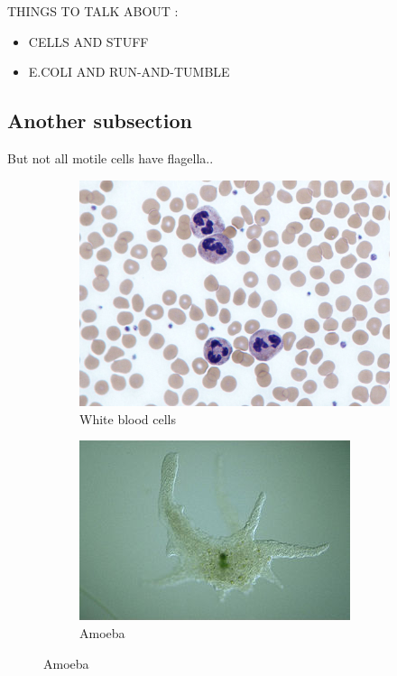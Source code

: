 \begin{outline}

  THINGS TO TALK ABOUT :
  \begin{itemize}
    \item CELLS AND STUFF
    \item E.COLI AND RUN-AND-TUMBLE
  \end{itemize}

\end{outline}


\subsection{Another subsection}

\begin{frame}{\insertsubsectionhead}

  But not all motile cells have flagella..
  
  \begin{figure}
    
		\begin{subfigure}{0.4\textwidth}
			\includegraphics[width=\textwidth]{src/img/example1}
			\caption{White blood cells}
		\end{subfigure}
		\begin{subfigure}{0.44\textwidth}
			\includegraphics[width=\textwidth]{src/img/example2}
			\caption{Amoeba}
		\end{subfigure}
    

\end{figure}
\end{frame}
